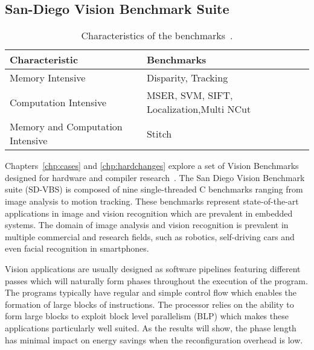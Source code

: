 \subsection{San-Diego Vision Benchmark Suite}\label{chp:setup:sdvbs}
\begin{table}[t]
  \smaller
  \centering
 \begin{tabular} { | l | l | }
 \hline
   \cellcolor[gray]{0.7}Characteristic & \cellcolor[gray]{0.7} Benchmarks\\ \hline
    Memory Intensive & Disparity, Tracking\\ \hline
	Computation Intensive & MSER, SVM, SIFT, Localization,Multi NCut\\\hline
	Memory and Computation Intensive & Stitch\\ \hline
   \end{tabular}
  \caption{Characteristics of the benchmarks~\cite{sdvbs}.}\label{tab:sd-vbschar}
\vspace{1em}
  \end{table}

Chapters~\ref{chp:cases} and \ref{chp:hardchanges} explore a set of Vision Benchmarks designed for hardware and compiler research~\cite{sdvbs}.
The San Diego Vision Benchmark suite (SD-VBS) is composed of nine single-threaded C benchmarks ranging from image analysis to motion tracking.
These benchmarks represent state-of-the-art applications in image and vision recognition which are prevalent in embedded systems.
The domain of image analysis and vision recognition is prevalent in multiple commercial and research fields, such as robotics, self-driving cars and even facial recognition in smartphones.

Vision applications are usually designed as software pipelines featuring different passes which will naturally form phases throughout the execution of the program.
The programs typically have regular and simple control flow which enables the formation of large blocks of instructions.
The processor relies on the ability to form large blocks to exploit block level parallelism (BLP) which makes these applications particularly well suited.
As the results will show, the phase length has minimal impact on energy savings when the reconfiguration overhead is low.

